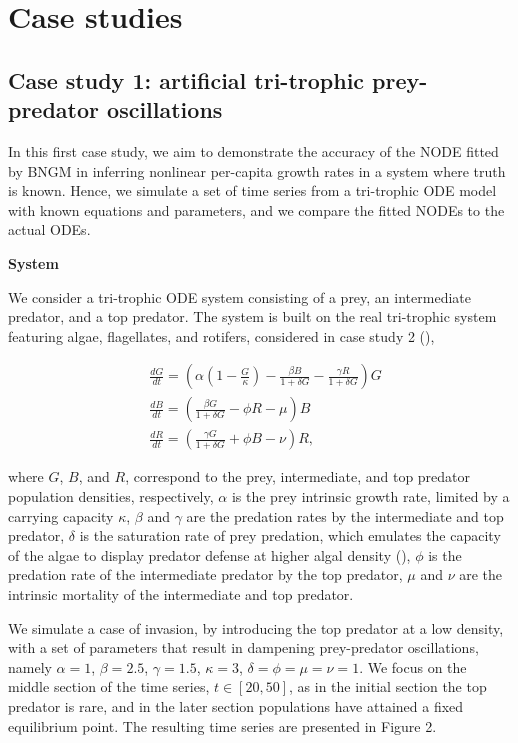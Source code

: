 \documentclass[11pt, oneside]{article}
\begin{document}
\section{Case studies}

\subsection{Case study 1: artificial tri-trophic prey-predator oscillations}

In this first case study, we aim to demonstrate the accuracy of the NODE fitted by BNGM in inferring nonlinear per-capita growth rates in a system where truth is known.
Hence, we simulate a set of time series from a tri-trophic ODE model with known equations and parameters, and we compare the fitted NODEs to the actual ODEs.

\textbf{System}

We consider a tri-trophic ODE system consisting of a prey, an intermediate predator, and a top predator.
The system is built on the real tri-trophic system featuring algae, flagellates, and rotifers, considered in case study 2 (\cite{Hiltunen2013}),

\vspace{-0.5cm}
\begin{equation} \begin{aligned}
    & \frac{dG}{dt} = \left( \alpha \left(1-\frac{G}{\kappa}\right) - \frac{\beta B}{1+\delta G} - \frac{\gamma R}{1+\delta G} \right) G\\
    & \frac{dB}{dt} = \left( \frac{\beta G}{1+\delta G} - \phi R - \mu \right) B \\
	& \frac{dR}{dt} = \left( \frac{\gamma G}{1+\delta G} + \phi B - \nu \right) R,
\end{aligned} \end{equation}

where $G$, $B$, and $R$, correspond to the prey, intermediate, and top predator population densities, respectively,
$\alpha$ is the prey intrinsic growth rate, limited by a carrying capacity $\kappa$, 
$\beta$ and $\gamma$ are the predation rates by the intermediate and top predator,
$\delta$ is the saturation rate of prey predation, which emulates the capacity of the algae to display predator defense at higher algal density (\cite{Hiltunen2013}),
$\phi$ is the predation rate of the intermediate predator by the top predator,
$\mu$ and $\nu$ are the intrinsic mortality of the intermediate and top predator.

We simulate a case of invasion, by introducing the top predator at a low density, with a set of parameters that result in dampening prey-predator oscillations, namely $\alpha = 1$, $\beta = 2.5$, $\gamma = 1.5$, $\kappa = 3$, $\delta = \phi = \mu = \nu = 1$.
We focus on the middle section of the time series, $t \in [20,50]$, as in the initial section the top predator is rare, and in the later section populations have attained a fixed equilibrium point.
The resulting time series are presented in Figure 2.
\end{document}
